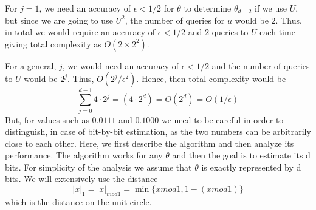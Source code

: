 For $j=1$, we need an accuracy of $\epsilon<1/2$ for $\theta$ to determine $\theta_{d-2}$ if we use $U$, but since we are going to use $U^2$, the number of queries for $u$ would be $2$. Thus, in total we would require an accuracy of $\epsilon<1/2$ and $2$ queries to $U$ each time giving total complexity as $O(2\times 2^2)$.

For a general, $j$, we would need an accuracy of $\epsilon<1/2$ and the number of queries to $U$ would be $2^j$. Thus, $O(2^j/\epsilon^2)$. Hence, then total complexity would be
\[
\sum_{j=0}^{d-1} 4\cdot 2^j=(4\cdot 2^d)=O(2^d)=O(1/\epsilon)
\]
But, for values such as $0.0111$ and $0.1000$ we need to be careful in order to distinguish, in case of bit-by-bit estimation, as the two numbers can be arbitrarily close to each other. Here, we first describe the algorithm and then analyze its performance. The algorithm works for any $\theta$ and then the goal is to estimate its d bits. For simplicity of the analysis we assume that $\theta$ is exactly represented by d bits. We will extensively use the distance
\[
|x|_1=|x|_{mod 1}=\min \{x mod 1,1-(x mod 1)\}
\]
which is the distance on the unit circle.
